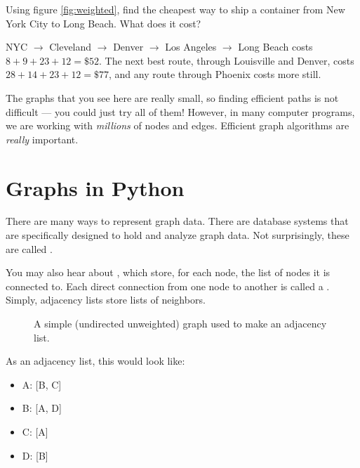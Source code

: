 \begin{Exercise}[title={Ship it}, label=graph_ship]
Using figure \ref{fig:weighted}, find the cheapest way to ship a container
from New York City to Long Beach. What does it cost?
\end{Exercise}
\begin{Answer}[ref=graph_ship]
NYC $\to$ Cleveland $\to$ Denver $\to$ Los Angeles $\to$ Long Beach costs
$8 + 9 + 23 + 12 = \$52$. The next best route, through Louisville and
Denver, costs $28 + 14 + 23 + 12 = \$77$, and any route through Phoenix
costs more still.
\end{Answer}

The graphs that you see here are really small, so finding efficient
paths is not difficult --- you could just try all of them! However, in
many computer programs, we are working with \emph{millions} of nodes and
edges. Efficient graph algorithms are \textit{really} important.

\section{Graphs in Python}
There are many ways to represent graph data. There are database systems that are specifically designed to hold
and analyze graph data. Not surprisingly, these are called .

You may also hear about , which store, for each node, the list of nodes it is connected to. Each direct connection from one node to another is called a . Simply, adjacency lists store lists of neighbors.

\begin{figure}[H]
  \centering

  \caption{A simple (undirected unweighted) graph used to make an adjacency list.}
  \label{fig:adjacency}
\end{figure}

As an adjacency list, this would look like:
\begin{itemize}
  \item A: [B, C]
  \item B: [A, D]
  \item C: [A]
  \item D: [B]
\end{itemize}

